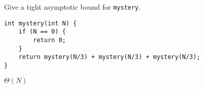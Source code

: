 \begin{blocksection}
\question Give a tight asymptotic bound for \lstinline$mystery$.

\begin{lstlisting}
int mystery(int N) {
    if (N == 0) {
        return 0;
    }
    return mystery(N/3) + mystery(N/3) + mystery(N/3);
}
\end{lstlisting}

\begin{solution}[1in]
$\Theta(N)$
\end{solution}
\end{blocksection}
